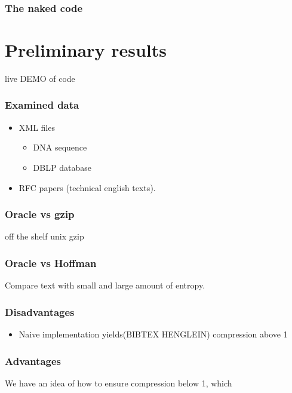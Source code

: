 \documentclass[slidestop,compress,mathserif, xcolor=table]{beamer}
\begin{document}
\begin{frame}
  \frametitle{The naked code}
  
\end{frame}

\section{Preliminary results}

\begin{frame}
  \begin{center}
    \huge{live DEMO of code}
  \end{center}
\end{frame}

\begin{frame}
  \frametitle{Examined data}
  \begin{itemize}
  \item XML files
    
    \begin{itemize}
    \item DNA sequence
      
    \item DBLP database
    \end{itemize}

  \item RFC papers (technical english texts).
    
  \end{itemize}
\end{frame}

\begin{frame}
  \frametitle{Oracle vs gzip}
  
  off the shelf unix gzip
\end{frame}

\begin{frame}
  \frametitle{Oracle vs Hoffman}
  Compare text with small and large amount of entropy.
\end{frame}

\begin{frame}
  \frametitle{Disadvantages}

  \begin{itemize}
  \item Naive implementation yields(BIBTEX HENGLEIN) compression above 1
  \end{itemize}


\end{frame}

\begin{frame}
  \frametitle{Advantages}

  We have an idea of how to ensure compression below 1, which
\end{frame}
\end{document}
